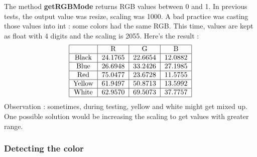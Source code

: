\documentclass[a4paper, 12pt]{article}
\begin{document}
The method \textbf{getRGBMode} returns RGB values between 0 and 1. In previous tests, the output value was resize, scaling was 1000. A bad practice was casting those values into int : some colors had the same RGB. This time, values are kept as float with 4 digits and the scaling is 2055. Here's the result :
\begin{align}
\begin{tabular}{|c|c|c|c|}
\hline 
 & R & G & B \\ 
\hline 
\text{Black} & 24.1765 & 22.6654 & 12.0882 \\ 
\hline 
\text{Blue} & 26.6948 & 33.2426 & 27.1985 \\ 
\hline 
\text{Red} & 75.0477 & 23.6728 & 11.5755 \\ 
\hline 
\text{Yellow} & 61.9497 & 50.8713 & 13.5992 \\ 
\hline 
\text{White} & 62.9570 & 69.5073 & 37.7757 \\ 
\hline 
\end{tabular} 
\end{align}
Observation : sometimes, during testing, yellow and white might get mixed up. One possible solution would be increasing the scaling to get values with greater range.

\subsubsection{Detecting the color}
\end{document}
